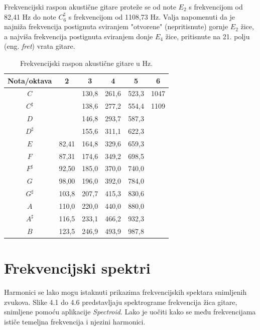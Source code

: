 \documentclass[times, utf8, zavrsni, numeric]{fer}
\begin{document}
Frekvencijski raspon akustične gitare proteže se od note $E_2$ s frekvencijom od 82,41 Hz do note $C_6^\sharp$ s frekvencijom od 1108,73 Hz. Valja napomenuti da je najniža frekvencija postignuta sviranjem "otvorene" (nepritisnute) gornje $E_2$ žice, a najviša frekvencija postignuta sviranjem donje $E_4$ žice, pritisnute na 21. polju (eng. \textit{fret}) vrata gitare.

\clearpage

\begin{table}
	\begin{center}
		\begin{tabular}{c|c c c c c}
			Nota/oktava  & 2 & 3 & 4 & 5 & 6\\
			\hline
			$C$ & & 130,8 & 261,6 & 523,3 & 1047\\
			\hline
			$C^\sharp$ &  & 138,6 & 277,2 & 554,4 & 1109\\
			\hline
			$D$ & & 146,8 & 293,7 & 587,3 & \\
			\hline
			$D^\sharp$ & & 155,6 & 311,1 & 622,3 & \\
			\hline
			$E$ & 82,41 & 164,8 & 329,6 & 659,3 & \\
			\hline
			$F$ & 87,31 &174,6 & 349,2 & 698,5 & \\
			\hline
			$F^\sharp$ & 92,50 & 185,0 & 370,0 & 740,0 & \\
			\hline
			$G$ & 98,00 & 196,0 & 392,0 & 784,0 & \\
			\hline
			$G^\sharp$ & 103,8 & 207,7 & 415,3 & 830,6 & \\
			\hline
			$A$ & 110,0 & 220,0 & 440,0 & 880,0 & \\
			\hline
			$A^\sharp$ & 116,5 & 233,1 & 466,2 & 932,3 & \\
			\hline
			$B$ & 123,5 & 246,9 & 493,9 & 987,8 & \\
		\end{tabular}
		\caption{Frekvencijski raspon akustične gitare u Hz.}
	\end{center}
\end{table}

\section{Frekvencijski spektri}
Harmonici se lako mogu istaknuti prikazima frekvencijskih spektara snimljenih zvukova. Slike 4.1 do 4.6 predstavljaju spektrograme frekvencija žica gitare, snimljene pomoću aplikacije \textit{Spectroid}. Lako je uočiti kako se među frekvencijama ističe temeljna frekvencija i njezini harmonici.
\end{document}

